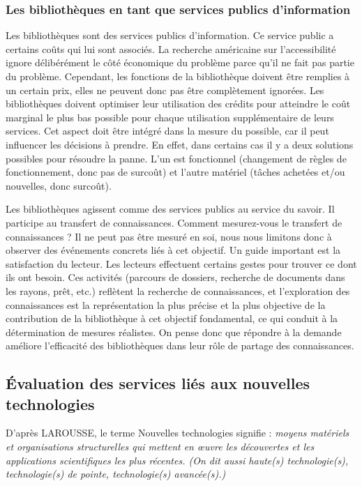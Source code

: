 \documentclass[french,a4paper,12pt]{article}
\begin{document}
\subsubsection{Les bibliothèques en tant que services publics d'information} 

 \quad Les bibliothèques sont des services publics d'information. Ce service public a certains coûts qui lui sont associés. La recherche américaine sur l'accessibilité ignore délibérément le côté économique du problème parce qu'il ne fait pas partie du problème. Cependant, les fonctions de la bibliothèque doivent être remplies à un certain prix, elles ne peuvent donc pas être complètement ignorées. Les bibliothèques doivent optimiser leur utilisation des crédits pour atteindre le coût marginal le plus bas possible pour chaque utilisation supplémentaire de leurs services. Cet aspect doit être intégré dans la mesure du possible, car il peut influencer les décisions à prendre. En effet, dans certains cas il y a deux solutions possibles pour résoudre la panne. L'un est fonctionnel (changement de règles de fonctionnement, donc pas de surcoût) et l'autre matériel (tâches achetées et/ou nouvelles, donc surcoût).
 
 \quad Les bibliothèques agissent comme des services publics au service du savoir. Il participe au transfert de connaissances. Comment mesurez-vous le transfert de connaissances ? Il ne peut pas être mesuré en soi, nous nous limitons donc à observer des événements concrets liés à cet objectif. Un guide important est la satisfaction du lecteur. Les lecteurs effectuent certains gestes pour trouver ce dont ils ont besoin. Ces activités (parcours de dossiers, recherche de documents dans les rayons, prêt, etc.) reflètent la recherche de connaissances, et l'exploration des connaissances est la représentation la plus précise et la plus objective de la contribution de la bibliothèque à cet objectif fondamental, ce qui conduit à la détermination de mesures réalistes. On pense donc que répondre à la demande améliore l'efficacité des bibliothèques dans leur rôle de partage des connaissances. 
 




\subsection{Évaluation des services liés aux nouvelles technologies}

\quad D'après LAROUSSE, le terme Nouvelles technologies signifie :\textit{ moyens matériels et organisations structurelles qui mettent en œuvre les découvertes et les applications scientifiques les plus récentes. (On dit aussi haute(s) technologie(s), technologie(s) de pointe, technologie(s) avancée(s).)}\\
\end{document}
